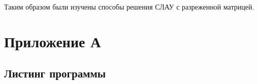 \documentclass[a4paper, fontsize=14pt]{article}
\begin{document}
Таким образом были изучены способы решения СЛАУ с разреженной матрицей.


\newpage


\printbibliography
\newpage
\section*{Приложение А}
\subsection*{Листинг программы}



\newpage

\end{document}
